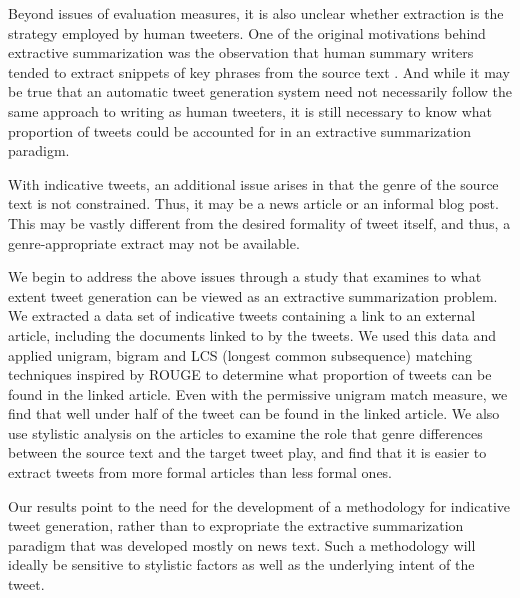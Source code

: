 Beyond issues of evaluation measures, it is also unclear whether extraction is the strategy employed by human tweeters. One of the original motivations behind extractive summarization was the observation that human summary writers tended to extract snippets of key phrases from the source text \cite{mani-2001}.  And while it may be true that an automatic tweet generation system need not necessarily follow the same approach to writing as human tweeters, it is still necessary to know what proportion of tweets could be accounted for in an extractive summarization paradigm.

With indicative tweets, an additional issue arises in that the genre of the source text is not constrained. Thus, it may be a news article or an informal blog post. This may be vastly different from the desired formality of tweet itself, and thus, a genre-appropriate extract may not be available.

We begin to address the above issues through a study that examines to what extent tweet generation can be viewed as an extractive summarization problem. We extracted a data set of indicative tweets containing a link to an external article, including the documents linked to by the tweets. We used this data and applied unigram, bigram and LCS (longest common subsequence) matching techniques inspired by ROUGE to determine what proportion of tweets can be found in the linked article. Even with the permissive unigram match measure, we find that well under half of the tweet can be found in the linked article. We also use stylistic analysis on the articles to examine the role that genre differences between the source text and the target tweet play, and find that it is easier to extract tweets from more formal articles than less formal ones.

Our results point to the need for the development of a methodology for indicative tweet generation, rather than to expropriate the extractive summarization paradigm that was developed mostly on news text. Such a methodology will ideally be sensitive to stylistic factors as well as the underlying intent of the tweet.